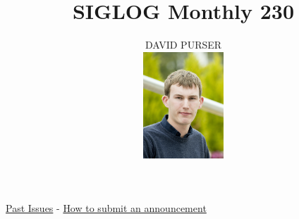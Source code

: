 \documentclass[prodmode,acmtecs]{acmsmall} %
\newcounter{colstart}
\begin{document}
\setcounter{colstart}{\thepage}

\title{\huge\sc SIGLOG Monthly 230}
\author{DAVID PURSER
\vspace*{-2.6cm}\begin{flushright}\includegraphics[width=30mm]{dp}\end{flushright}
}

\maketitlee

\href{https://lics.siglog.org/newsletters/}{Past Issues}
 - 
\href{https://lics.siglog.org/newsletters/inst.html}{How to submit an announcement}
\end{document}
